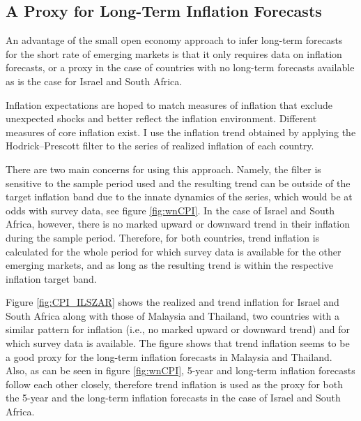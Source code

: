 \documentclass[a4paper, 12pt]{article}
\begin{document}
\newpage
\begin{appendices}
	
	\renewcommand\thefigure{\thesection.\arabic{figure}}
	\section{A Proxy for Long-Term Inflation Forecasts} \label{sec:trendinf}
	\setcounter{page}{1}
	\setcounter{figure}{0}
	
	An advantage of the small open economy approach to infer long-term forecasts for the short rate of emerging markets is that it only requires data on inflation forecasts, or a proxy in the case of countries with no long-term forecasts available as is the case for Israel and South Africa.
	
	Inflation expectations are hoped to match measures of inflation that exclude unexpected shocks and better reflect the inflation environment. 
	Different measures of core inflation exist. I use the inflation trend obtained by applying the Hodrick--Prescott filter to the series of realized inflation of each country.
	
	There are two main concerns for using this approach. Namely, the filter is sensitive to the sample period used and the resulting trend can be outside of the target inflation band due to the innate dynamics of the series, which would be at odds with survey data, see figure \ref{fig:wnCPI}. In the case of Israel and South Africa, however, there is no marked upward or downward trend in their inflation during the sample period. Therefore, for both countries, trend inflation is calculated for the whole period for which survey data is available for the other emerging markets, and as long as the resulting trend is within the respective inflation target band.
	
	Figure \ref{fig:CPI_ILSZAR} shows the realized and trend inflation for Israel and South Africa along with those of Malaysia and Thailand, two countries with a similar pattern for inflation (i.e., no marked upward or downward trend) and for which survey data is available. 
	The figure shows that trend inflation seems to be a good proxy for the long-term inflation forecasts in Malaysia and Thailand. 
	Also, as can be seen in figure \ref{fig:wnCPI}, 5-year and long-term inflation forecasts follow each other closely, therefore trend inflation is used as the proxy for both the 5-year and the long-term inflation forecasts in the case of Israel and South Africa.
	

\end{appendices}
\end{document}
